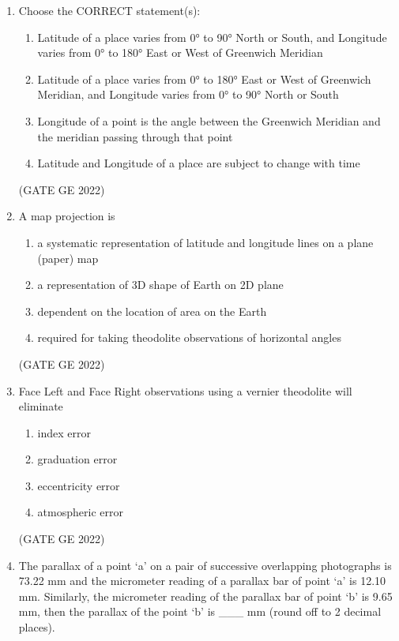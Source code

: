 \documentclass[a4paper, 11pt]{article}
\begin{document}
\begin{enumerate}
\item Choose the CORRECT statement(s):
\begin{enumerate}
    \item Latitude of a place varies from 0° to 90° North or South, and Longitude varies from 0° to 180° East or West of Greenwich Meridian
    \item Latitude of a place varies from 0° to 180° East or West of Greenwich Meridian, and Longitude varies from 0° to 90° North or South
    \item Longitude of a point is the angle between the Greenwich Meridian and the meridian passing through that point
    \item Latitude and Longitude of a place are subject to change with time
\end{enumerate}

\hfill (GATE GE 2022)

\item A map projection is
\begin{enumerate}
    \item a systematic representation of latitude and longitude lines on a plane (paper) map
    \item a representation of 3D shape of Earth on 2D plane
    \item dependent on the location of area on the Earth
    \item required for taking theodolite observations of horizontal angles
\end{enumerate}

\hfill (GATE GE 2022)

\item Face Left and Face Right observations using a vernier theodolite will eliminate
\begin{enumerate}
    \item index error
    \item graduation error
    \item eccentricity error
    \item atmospheric error
\end{enumerate}

\hfill (GATE GE 2022)

\item The parallax of a point ‘a’ on a pair of successive overlapping photographs is 73.22 mm and the micrometer reading of a parallax bar of point ‘a’ is 12.10 mm. Similarly, the micrometer reading of the parallax bar of point ‘b’ is 9.65 mm, then the parallax of the point ‘b’ is \_\_\_ mm (round off to 2 decimal places).


\end{enumerate}
\end{document}
